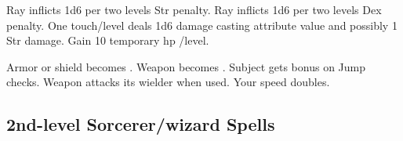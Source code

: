 \begin{swspelllist}
 Ray inflicts 1d6  per two levels Str penalty.
 Ray inflicts 1d6  per two levels Dex penalty.
 One touch/level deals 1d6 damage \add casting attribute value and possibly 1 Str damage.
 Gain 10 temporary hp /level.

 Armor or shield becomes .
 Weapon becomes .
 Subject gets bonus on Jump checks.
 Weapon attacks its wielder when used.
 Your speed doubles.
\end{swspelllist}

\subsection{2nd-level Sorcerer/wizard Spells} 
